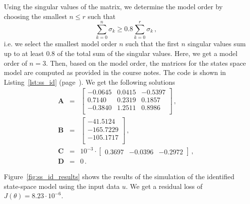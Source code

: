 Using the singular values of the matrix, we determine the model order by choosing the smallest $n \le r$ such that
\begin{equation}
	\sum\limits_{k=0}^{n}\sigma_k \ge 0.8\sum\limits_{k=0}^{r}\sigma_k\, ,
\end{equation}
i.e. we select the smallest model order $n$ such that the first $n$ singular values sum up to at least $0.8$ of the total sum of the singular values.
Here, we get a model order of $n = 3$.
Then, based on the model order, the matrices for the states space model are computed as provided in the course notes.
The code is shown in Listing~\ref{lst:ss_id} (page~\pageref{lst:ss_id}).
We get the following solutions
\begin{eqnarray}
	\mathbf{A} &=& \begin{bmatrix}
			-0.0645  & 0.0415 & -0.5397\\
			 0.7140  & 0.2319 &  0.1857\\
			-0.3840  & 1.2511 &  0.8986\\
	\end{bmatrix}\,,\\
	\mathbf{B} &=& \begin{bmatrix}
		 -41.5124\\
		-165.7229\\
		-105.1717\\
	\end{bmatrix}\,,\\
	\mathbf{C} &=& 10^{-3} \cdot \begin{bmatrix}
	    0.3697 & -0.0396 & -0.2972
	\end{bmatrix}\, ,\\
	\mathbf{D} &=& 0\, .
\end{eqnarray}

Figure~\ref{fig:ss_id_results} shows the results of the simulation of the identified state-space model using the input data $u$.
We get a residual loss of $J(\theta) = 8.23 \cdot 10^{-6}$.

